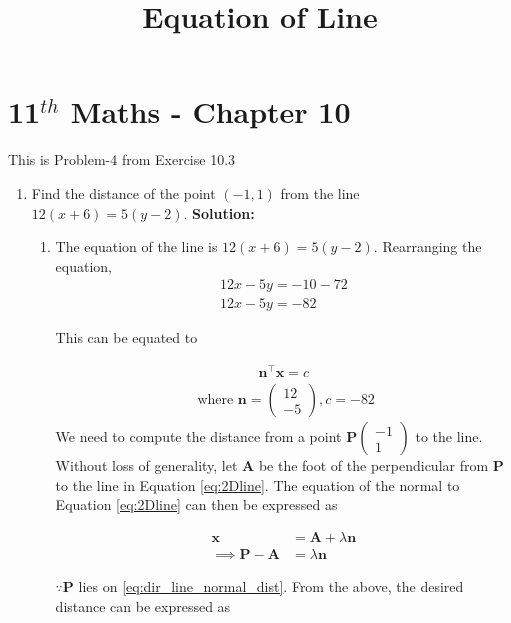 \documentclass[12pt]{article}
\providecommand{\brak}[1]{\ensuremath{\left(#1\right)}}
\newcommand{\solution}{\noindent \textbf{Solution: }}
\newcommand{\myvec}[1]{\ensuremath{\begin{pmatrix}#1\end{pmatrix}}}
\let\vec\mathbf
\begin{document}
\begin{center}
\title{\textbf{Equation  of Line}}
\date{\vspace{-5ex}} %
\maketitle
\end{center}
\setcounter{page}{1}

\section{11$^{th}$ Maths - Chapter 10}
This is Problem-4 from Exercise 10.3
\begin{enumerate}
\item Find the distance of the point $(-1,1)$ from the line $12\brak{x+6} = 5\brak{y-2}$. 
\solution 
\begin{enumerate}
\item The equation of the line is $12\brak{x+6} = 5\brak{y-2}$. Rearranging the equation, 
\begin{align}
12x-5y = -10-72 \\
12x-5y = -82
\end{align}

This can be equated to

\begin{align}
	\label{eq:2Dline}
	\vec{n}^\top\vec{x} = c 
\end{align}
\begin{align}
	\text{ where }
		\vec{n} = \myvec{
	  12 \\
	  -5 
	  } ,   c = -82 
\end{align}
		We need to compute the distance from a point $\vec{P}\myvec{-1 \\ 1}$ to the line. 
Without loss of generality, let $\vec{A}$ be the foot of the perpendicular from $\vec{P}$ to the line in Equation \eqref{eq:2Dline}. 
The equation of the normal to Equation \eqref{eq:2Dline} can then be expressed as 

\begin{align}
	\label{eq:dir_line_normal_dist}
	\vec{x} &= \vec{A} + \lambda \vec{n}
	\\
	\implies 
	\label{eq:dir_line_normal_dist_pa}
	\vec{P}- \vec{A} &=  \lambda \vec{n}
\end{align}

$\because \vec{P}$ lies on 
		\eqref{eq:dir_line_normal_dist}.
From the above, the desired distance can be expressed as 


\end{enumerate}
\end{enumerate}
\end{document}
